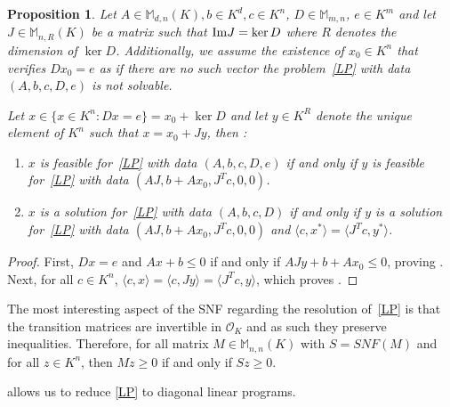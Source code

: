 \documentclass[a4paper,12pt]{article}
\newtheorem{proposition}[theorem]{Proposition}
\newcommand{\allmat}{\mathbb{M}} %
\newcommand{\OK}{\mathcal{O}_K}
\begin{document}
\begin{proposition}\label{reducD}
  Let $A \in \allmat_{d,n}(K), b \in K^d, c\in K^n$, $D \in \allmat_{m,n}$, $e \in K^m$ and let $J \in \allmat_{n,R}\left( K \right) $ be a matrix such that ${\rm Im } J = \ker D$ where $R$ denotes the dimension of $\ker D$. 
  Additionally, we assume the existence of $x_0 \in K^n$ that verifies $D x_0 =e$ as if
  there are no such vector the problem~\ref{LP} with data $(A,b,c,D,e)$ is not solvable.

  Let $x \in \{x \in K^n : Dx=e\} = x_0 + \ker D $ and let $y \in K^R$ denote the unique element of
  $K^n$ such that $x = x_0 + J y$, then :
  \begin{enumerate}
    \item\label{reducD_item1} $x$ is feasible for~\eqref{LP} with data $(A,b,c,D,e)$ if and only if 
      $y$ is feasible for~\eqref{LP} with data $(AJ,b+A x_0,J^T c,0,0)$.
    \item\label{reducD_item2} $x$ is a solution for~\eqref{LP} with data $(A,b,c,D)$ if and only if 
      $y$ is a solution for~\eqref{LP} with data $(AJ,b+A x_0,J^T c,0,0)$ and $\langle c,x^* \rangle = \langle J^T c,y^* \rangle$.
  \end{enumerate}
\end{proposition}

\begin{proof}
  First,  $Dx=e$ and $Ax + b \le 0$ if and only if $AJy + b+Ax_0 \le 0$, proving .
  Next, for all $c \in K^n$, $\langle c,x\rangle = \langle c, Jy\rangle = \langle J^T c,y\rangle$, which proves .
\end{proof}
 
The most interesting aspect of the SNF regarding the resolution of~\eqref{LP} is that the transition matrices are
invertible in $\OK$ and as such they preserve inequalities. %
Therefore, for all matrix $M \in \allmat_{n,n}(K)$ with $S=SNF(M)$ and for all $z \in K^n$,
then $Mz \geq 0$ if and only if $Sz \geq 0$.

 allows us to reduce \eqref{LP} to diagonal linear programs.
\end{document}
